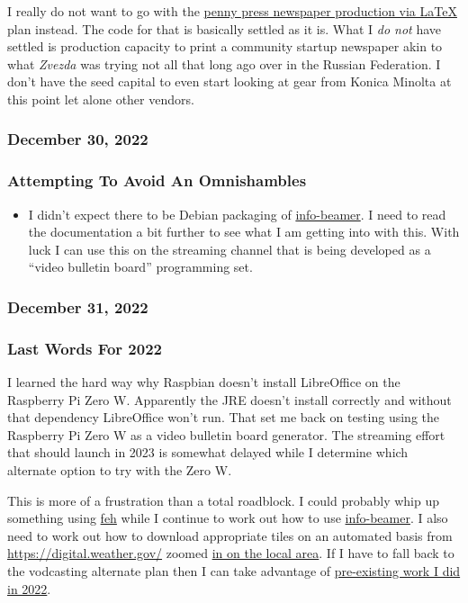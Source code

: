 I really do not want to go with the
\href{https://code.launchpad.net/~skellat/+git/auto-newspaper}{penny
press newspaper production via LaTeX} plan instead. The code for that is
basically settled as it is. What I \emph{do not} have settled is
production capacity to print a community startup newspaper akin to what
\emph{Zvezda} was trying not all that long ago over in the Russian
Federation. I don't have the seed capital to even start looking at gear
from Konica Minolta at this point let alone other vendors.

\subsubsection{December 30, 2022}\label{december-30-2022}

\subsubsection{Attempting To Avoid An
Omnishambles}\label{attempting-to-avoid-an-omnishambles}

\begin{itemize}
\tightlist
\item
  I didn't expect there to be Debian packaging of
  \href{https://info-beamer.com/}{info-beamer}. I need to read the
  documentation a bit further to see what I am getting into with this.
  With luck I can use this on the streaming channel that is being
  developed as a ``video bulletin board'' programming set.
\end{itemize}

\subsubsection{December 31, 2022}\label{december-31-2022}

\subsubsection{Last Words For 2022}\label{last-words-for-2022}

I learned the hard way why Raspbian doesn't install LibreOffice on the
Raspberry Pi Zero W. Apparently the JRE doesn't install correctly and
without that dependency LibreOffice won't run. That set me back on
testing using the Raspberry Pi Zero W as a video bulletin board
generator. The streaming effort that should launch in 2023 is somewhat
delayed while I determine which alternate option to try with the Zero W.

This is more of a frustration than a total roadblock. I could probably
whip up something using \href{https://feh.finalrewind.org/}{feh} while I
continue to work out how to use
\href{https://github.com/info-beamer}{info-beamer}. I also need to work
out how to download appropriate tiles on an automated basis from
\url{https://digital.weather.gov/} zoomed
\href{https://digital.weather.gov/?zoom=8&lat=41.3043&lon=-80.55885&layers=F000BTTTTTT&region=0&element=4&mxmz=false&barbs=true&subl=TTTTF&units=english&wunits=nautical&coords=latlon&tunits=localt}{in
on the local area}. If I have to fall back to the vodcasting alternate
plan then I can take advantage of
\href{https://coyote.works/howtouse.html}{pre-existing work I did in
2022}.
